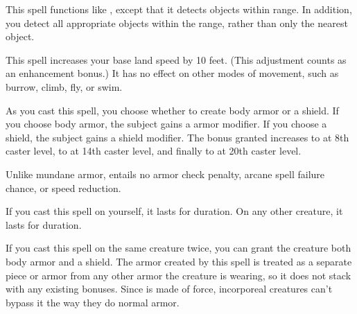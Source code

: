 \spellrng{\rngext}
\begin{spelleffect}
    This spell functions like , except that it detects objects within \rngext range. In addition, you detect all appropriate objects within the range, rather than only the nearest object. 
\end{spelleffect}

\spellrng{\rngpers}
\begin{spelleffect}
  This spell increases your base land speed by 10 feet. (This adjustment counts as an enhancement bonus.) It has no effect on other modes of movement, such as burrow, climb, fly, or swim.
\end{spelleffect}

\begin{comment}
\subsubsection{M}
\end{comment}

\spellrng{\rngclose}
\begin{spelleffect}
    As you cast this spell, you choose whether to create body armor or a shield. If you choose body armor, the subject gains a  armor modifier. If you choose a shield, the subject gains a  shield modifier. The bonus granted increases to  at 8th caster level, to  at 14th caster level, and finally to  at 20th caster level. 
  \par Unlike mundane armor,  entails no armor check penalty, arcane spell failure chance, or speed reduction.
  \par If you cast this spell on yourself, it lasts for \durlong duration. On any other creature, it lasts for \durshort duration.
\end{spelleffect}
\begin{spellnotes}
    If you cast this spell on the same creature twice, you can grant the creature both body armor and a shield. The armor created by this spell is treated as a separate piece or armor from any other armor the creature is wearing, so it does not stack with any existing bonuses. Since  is made of force, incorporeal creatures can't bypass it the way they do normal armor.
\end{spellnotes}

